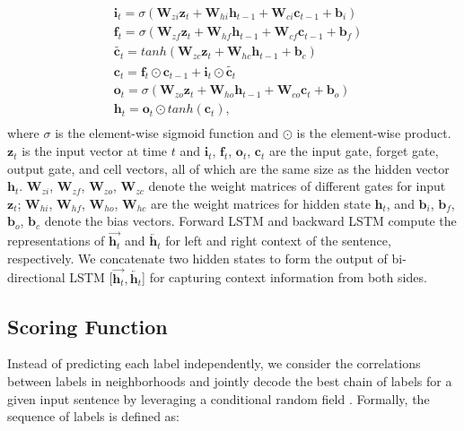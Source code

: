 \documentclass[11pt,a4paper]{article}
\begin{document}
\begin{align*}
& \textbf{i}_{t} = \sigma(\textbf{W}_{zi}\textbf{z}_{t} + \textbf{W}_{hi}\textbf{h}_{t-1} + \textbf{W}_{ci}\textbf{c}_{t-1} + \textbf{b}_{i}) \\
& \textbf{f}_{t} = \sigma(\textbf{W}_{zf}\textbf{z}_{t} + \textbf{W}_{hf}\textbf{h}_{t-1} + \textbf{W}_{cf}\textbf{c}_{t-1} + \textbf{b}_{f}) \\
& \widetilde{\textbf{c}_{t}} = tanh(\textbf{W}_{zc}\textbf{z}_{t} + \textbf{W}_{hc}\textbf{h}_{t-1} + \textbf{b}_{c}) \\
& \textbf{c}_{t} = \textbf{f}_{t} \odot \textbf{c}_{t-1} + \textbf{i}_{t} \odot \widetilde{\textbf{c}_{t}} \\
& \textbf{o}_{t} = \sigma(\textbf{W}_{zo}\textbf{z}_{t} + \textbf{W}_{ho}\textbf{h}_{t-1} + \textbf{W}_{co}\textbf{c}_{t} + \textbf{b}_{o}) \\
& \textbf{h}_{t} = \textbf{o}_{t} \odot tanh(\textbf{c}_{t}), \\
\label{E:lstm}
\end{align*}
where $\sigma$ is the element-wise sigmoid function and $\odot$ is the element-wise product. $\textbf{z}_{t}$ is the input vector at time $t$ and $\textbf{i}_{t}$, $\textbf{f}_{t}$, $\textbf{o}_{t}$, $\textbf{c}_{t}$ are the input gate, forget gate, output gate, and cell vectors, all of which are the same size as the hidden vector $\textbf{h}_{t}$. $\textbf{W}_{zi}$, $\textbf{W}_{zf}$, $\textbf{W}_{zo}$, $\textbf{W}_{zc}$ denote the weight matrices of different gates for input $\textbf{z}_{t}$; $\textbf{W}_{hi}$, $\textbf{W}_{hf}$, $\textbf{W}_{ho}$, $\textbf{W}_{hc}$ are the weight matrices for hidden state $\textbf{h}_{t}$, and $\textbf{b}_{i}$, $\textbf{b}_{f}$, $\textbf{b}_{o}$, $\textbf{b}_{c}$ denote the bias vectors. Forward LSTM and backward LSTM compute the representations of $\overrightarrow{\textbf{h}_{t}}$ and $\overleftarrow{\textbf{h}_{t}}$ for left and right context of the sentence, respectively. We concatenate two hidden states to form the output of bi-directional LSTM  [$\overrightarrow{\textbf{h}_{t}},\overleftarrow{\textbf{h}_{t}}$] for capturing context information from both sides. 

\subsection{Scoring Function}
Instead of predicting each label independently, we consider the correlations between labels in neighborhoods and jointly decode the best chain of labels for a given input sentence by leveraging a conditional random field \cite{lafferty2001conditional}. Formally, the sequence of labels is defined as:
\end{document}
